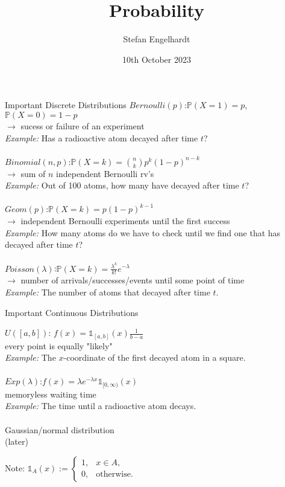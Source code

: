 \documentclass[11pt,pdf,ngerman,UKenglish]{beamer}%
\title{Probability}
\author{Stefan Engelhardt}
\date{10th October 2023}%
\newcommand{\IP}{\mathbb{P}}
\newcommand{\1}{\mathbb{1}}
\theoremstyle{thm}
\theoremstyle{def}
\begin{document}
\begin{frame}
\titlepage
\end{frame}
\logo{}




\begin{frame}{Important Discrete Distributions}
$Bernoulli(p)$:\quad $\IP(X =1)=p$, $\IP(X=0)=1-p$
\\
$\to$ sucess or failure of an experiment
\\
\textit{Example:} Has a radioactive atom decayed after time $t$?
\\ \ \\
$Binomial(n,p)$:\quad $\IP(X=k) = {n \choose k} p^{k} (1-p)^{n-k}$
\\
$\to$ sum of $n$ independent Bernoulli rv's
\\
\textit{Example:} Out of 100 atoms, how many have decayed after time $t$?
\\ \ \\
$Geom(p)$:\quad $\IP(X=k)=p(1-p)^{k-1}$
\\
$\to$ independent Bernoulli experiments until the first success
\\
\textit{Example:} How many atoms do we have to check until we find one that has decayed after time $t$?
\\ \ \\
$Poisson(\lambda)$:\quad $\IP(X = k) = \frac{\lambda^k}{k!} e^{-\lambda}$
\\
$\to$ number of arrivals/successes/events until some point of time
\\
\textit{Example:} The number of atoms that decayed after time $t$.
\end{frame}


\begin{frame}{Important Continuous Distributions}

$U([a,b])$: \quad $f(x) = \1_{[a,b]}(x) \frac{1}{b-a}$
\\
every point is equally "likely"
\\
\textit{Example:} The $x$-coordinate of the first decayed atom in a square.
\\ \ \\
$Exp(\lambda)$:\quad $f(x)= \lambda e^{-\lambda x} \1_{[0,\infty)}(x)$
\\
memoryless waiting time
\\
\textit{Example:} The time until a radioactive atom decays.
\\ \ \\
Gaussian/normal distribution
\\
(later)

\vfill
\vfill
\vfill
Note: $\1_A(x) := \begin{cases} 1, & x \in A,\\ 0, & \text{otherwise.} \end{cases}$
\end{frame}
\end{document}
